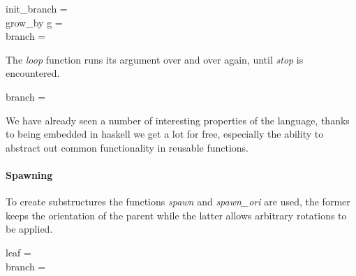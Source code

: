 \begin{haskell*}
init\!\_\!branch =  \\
grow\!\_\!by g = \\
branch =  \\
\end{haskell*}

The \emph{loop} function runs its argument over and over again,
until \emph{stop} is encountered.
\begin{haskell*}
branch = 
\end{haskell*}

    We have already seen a number of interesting properties of the
    language, thanks to being embedded in haskell we get a lot for
    free, especially the ability to abstract out common functionality
    in reusable functions.


\paragraph{Spawning}

    To create substructures the functions \emph{spawn} and
    \emph{spawn\_ori} are used, the former keeps the orientation
    of the parent while the latter allows arbitrary rotations to be
    applied.

\begin{haskell*}
leaf =  \\
branch = 
\end{haskell*}

